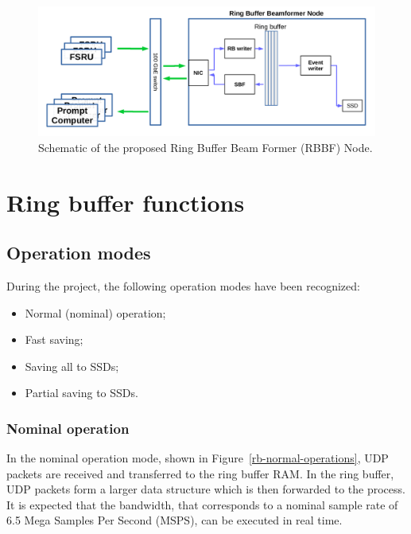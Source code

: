 \documentclass[12pt,a4paper]{article}
\begin{document}
\begin{figure}
\centering
\includegraphics[scale=0.4]{E3DDS_D2_RBBF_Node.png}
\caption{%
Schematic of the proposed Ring Buffer Beam Former (RBBF) Node. \label{fig-rb-node}}
\end{figure}

\section{Ring buffer functions}

\subsection{Operation modes}
During the project, the following operation modes have been recognized:
\begin{itemize}
\item Normal (nominal) operation;
\item Fast saving;
\item Saving all to SSDs;
\item Partial saving to SSDs.
\end{itemize}

\subsubsection{Nominal operation}

In the nominal operation mode, shown in Figure~\ref{rb-normal-operations}, UDP packets are received and transferred to the ring buffer RAM. 
In the ring buffer, UDP packets form a larger data structure which is then forwarded to the \SBF process. 
It is expected that the \NBW bandwidth, that corresponds to a nominal sample rate of 6.5 Mega Samples Per Second (MSPS), can be executed in real time. 
\end{document}
